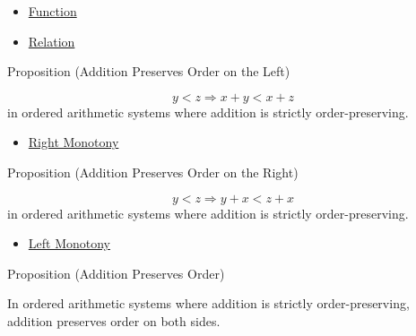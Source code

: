 \begin{dependencies}
\begin{itemize}
  \item \hyperref[def:function]{Function}
  \item \hyperref[def:relation]{Relation}
\end{itemize}
\end{dependencies}

\begin{propositionbox}{Proposition (Addition Preserves Order on the Left)}
\begin{proposition}
\label{prop:addition-order-compatibility-left}
\[
y<z \Longrightarrow x+y<x+z
\]
in ordered arithmetic systems where addition is strictly order-preserving.
\end{proposition}
\end{propositionbox}

\begin{dependencies}
\begin{itemize}
  \item \hyperref[def:right-monotony]{Right Monotony}
\end{itemize}
\end{dependencies}

\begin{propositionbox}{Proposition (Addition Preserves Order on the Right)}
\begin{proposition}
\label{prop:addition-order-compatibility-right}
\[
y<z \Longrightarrow y+x<z+x
\]
in ordered arithmetic systems where addition is strictly order-preserving.
\end{proposition}
\end{propositionbox}

\begin{dependencies}
\begin{itemize}
  \item \hyperref[def:left-monotony]{Left Monotony}
\end{itemize}
\end{dependencies}

\begin{propositionbox}{Proposition (Addition Preserves Order)}
\begin{proposition}
\label{prop:addition-order-compatibility}
In ordered arithmetic systems where addition is strictly order-preserving,
addition preserves order on both sides.
\end{proposition}
\end{propositionbox}

